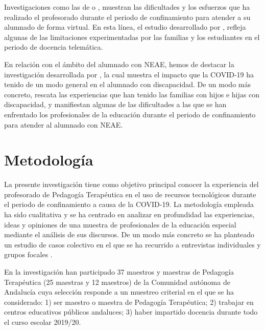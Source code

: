 \documentclass{textolivre}
\begin{document}
Investigaciones como las de \textcite{fernandezdomingues2020} %
o \textcite{tosso2020}, %
muestran las dificultades y los esfuerzos que ha realizado el profesorado durante el periodo de confinamiento para atender a su alumnado de forma virtual. En esta línea, el estudio desarrollado por \textcite{diez2020}, %
refleja algunas de las limitaciones experimentadas por las familias y los estudiantes en el periodo de docencia telemática.

En relación con el ámbito del alumnado con NEAE, hemos de destacar la investigación desarrollada por \textcite{vega2020}, %
la cual muestra el impacto que la COVID-19 ha tenido de un modo general en el alumnado con discapacidad. De un modo más concreto, \textcite{rodriguez2020} %
rescata las experiencias que han tenido las familias con hijos e hijas con discapacidad, y \textcite{menendez2020} %
manifiestan algunas de las dificultades a las que se han enfrentado los profesionales de la educación durante el periodo de confinamiento para atender al alumnado con NEAE.

\section{Metodología}
La presente investigación tiene como objetivo principal conocer la experiencia del profesorado de Pedagogía Terapéutica en el uso de recursos tecnológicos durante el periodo de confinamiento a causa de la COVID-19. La metodología empleada ha sido cualitativa \cite{denzin2005} %
y se ha centrado en analizar en profundidad las experiencias, ideas y opiniones de una muestra de profesionales de la educación especial mediante el análisis de sus discursos. De un modo más concreto se ha planteado un estudio de casos colectivo \cite{stake1998} %
en el que se ha recurrido a entrevistas individuales \cite{ruiz2009} %
y grupos focales \cite{yin2009}. %

En la investigación han participado 37 maestros y maestras de Pedagogía Terapéutica (25 maestras y 12 maestros) de la Comunidad autónoma de Andalucía cuya selección responde a un muestreo criterial en el que se ha considerado: 1) ser maestro o maestra de Pedagogía Terapéutica; 2) trabajar en centros educativos públicos andaluces; 3) haber impartido docencia durante todo el curso escolar 2019/20.
\end{document}

